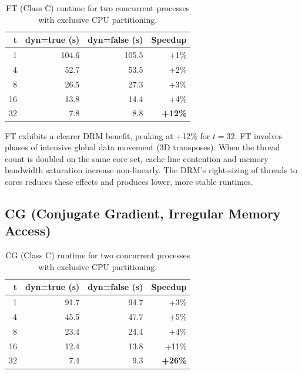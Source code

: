 \begin{table}[htpb]
  \caption[FT benchmark results]{FT (Class C) runtime for two concurrent processes with exclusive CPU partitioning.}\label{tab:ft_results}
  \centering
  \begin{tabular}{r r r r}
    \toprule
    \textbf{t} & \textbf{dyn=true (s)} & \textbf{dyn=false (s)} & \textbf{Speedup} \\
    \midrule
    1  & 104.6 & 105.5 & +1\%          \\
    4  & 52.7  & 53.5  & +2\%          \\
    8  & 26.5  & 27.3  & +3\%          \\
    16 & 13.8  & 14.4  & +4\%          \\
    32 & 7.8   & 8.8   & \textbf{+12\%} \\
    \bottomrule
  \end{tabular}
\end{table}

FT exhibits a clearer DRM benefit, peaking at +12\% for $t=32$. FT involves phases of intensive global data movement (3D transposes). When the thread count is doubled on the same core set, cache line contention and memory bandwidth saturation increase non-linearly. The DRM's right-sizing of threads to cores reduces these effects and produces lower, more stable runtimes.

\subsection{CG (Conjugate Gradient, Irregular Memory Access)}

\begin{table}[htpb]
  \caption[CG benchmark results]{CG (Class C) runtime for two concurrent processes with exclusive CPU partitioning.}\label{tab:cg_results}
  \centering
  \begin{tabular}{r r r r}
    \toprule
    \textbf{t} & \textbf{dyn=true (s)} & \textbf{dyn=false (s)} & \textbf{Speedup} \\
    \midrule
    1  & 91.7 & 94.7 & +3\%           \\
    4  & 45.5 & 47.7 & +5\%           \\
    8  & 23.4 & 24.4 & +4\%           \\
    16 & 12.4 & 13.8 & +11\%          \\
    32 & 7.4  & 9.3  & \textbf{+26\%} \\
    \bottomrule
  \end{tabular}
\end{table}

